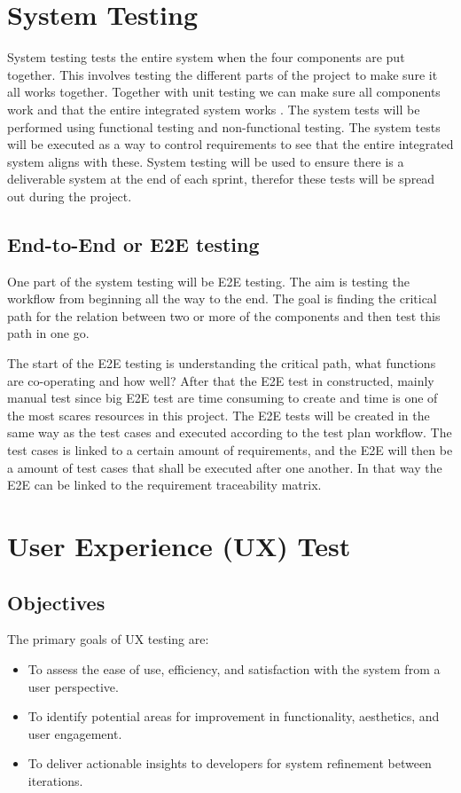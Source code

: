 \documentclass{article}
\begin{document}
\section{System Testing}
System testing tests the entire system when the four components are put together. This involves testing the different parts of the project to make sure it all works together. Together with unit testing we can make sure all components work and that the entire integrated system works . The system tests will be performed using functional testing and non-functional testing. The system tests will be executed as a way to control requirements to see that the entire integrated system aligns with these.  System testing will be used to ensure there is a deliverable system at the end of each sprint, therefor these tests will be spread out during the project.
\subsection{End-to-End or E2E testing}

One part of the system testing will be E2E testing. The aim is testing the workflow from beginning all the way to the end. The goal is finding the critical path for the relation between two or more of the components and then test this path in one go. 

The start of the E2E testing is understanding the critical path, what functions are co-operating and how well? After that the E2E test in constructed, mainly manual test since big E2E test are time consuming to create and time is one of the most scares resources in this project. The E2E tests will be created in the same way as the test cases and executed according to the test plan workflow. The test cases is linked to a certain amount of requirements, and the E2E will then be a amount of test cases that shall be executed after one another. In that way the E2E can be linked to the requirement traceability matrix. 





\section{User Experience (UX) Test}

\subsection{Objectives}
The primary goals of UX testing are:
\begin{itemize}
    \item To assess the ease of use, efficiency, and satisfaction with the system from a user perspective.
    \item To identify potential areas for improvement in functionality, aesthetics, and user engagement.
    \item To deliver actionable insights to developers for system refinement between iterations.
\end{itemize}
\end{document}
